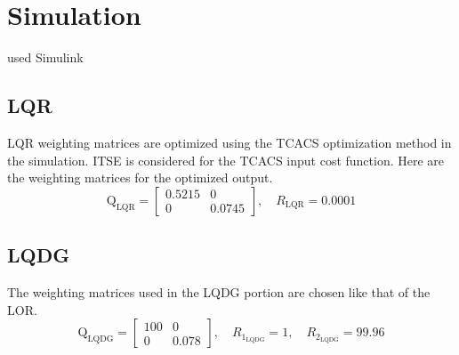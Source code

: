 \documentclass[conference]{IEEEtran}
\begin{document}

\section{Simulation}
used Simulink
\subsection{LQR}

LQR weighting matrices are optimized using the TCACS optimization method in the simulation.
ITSE is considered for the TCACS input cost function.
Here are the weighting matrices for the optimized output.
\begin{equation}
	\boldsymbol{\mathrm{Q}}_{\text{LQR}} = \begin{bmatrix}
		0.5215 & 0\\
		0 & 0.0745
	\end{bmatrix}, \quad R_{\text{LQR}} =  0.0001
\end{equation} 

\subsection{LQDG}
The weighting matrices used in the LQDG portion are chosen like that of the LOR.
\begin{equation}
	\boldsymbol{\mathrm{Q}}_{\text{LQDG}} = \begin{bmatrix}
		100 & 0\\
		0 & 0.078
	\end{bmatrix}, \quad R_{1_{\text{LQDG}}} =  1, \quad R_{2_{\text{LQDG}}} =  99.96
\end{equation}
\end{document}

